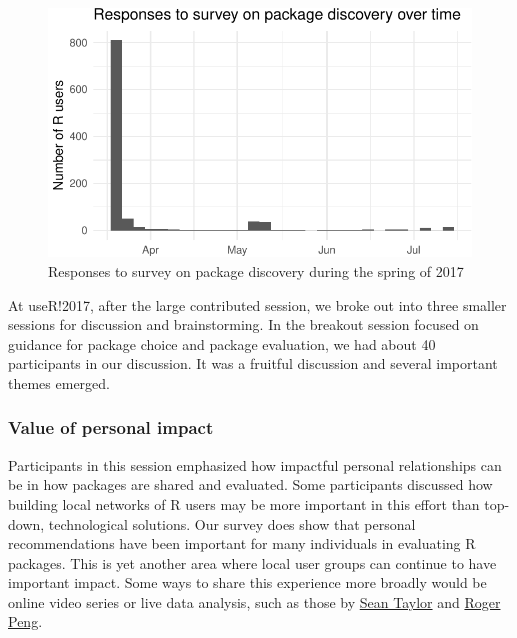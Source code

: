 \begin{Schunk}
\begin{figure}
\includegraphics{navigating_files/figure-latex/survey_time-1} \caption[Responses to survey on package discovery during the spring of 2017]{Responses to survey on package discovery during the spring of 2017}\label{fig:survey_time}
\end{figure}
\end{Schunk}

At useR!2017, after the large contributed session, we broke out into
three smaller sessions for discussion and brainstorming. In the breakout
session focused on guidance for package choice and package evaluation,
we had about 40 participants in our discussion. It was a fruitful
discussion and several important themes emerged.

\hypertarget{value-of-personal-impact}{%
\subsubsection{Value of personal
impact}\label{value-of-personal-impact}}

Participants in this session emphasized how impactful personal
relationships can be in how packages are shared and evaluated. Some
participants discussed how building local networks of R users may be
more important in this effort than top-down, technological solutions.
Our survey does show that personal recommendations have been important
for many individuals in evaluating R packages. This is yet another area
where local user groups can continue to have important impact. Some ways
to share this experience more broadly would be online video series or
live data analysis, such as those by
\href{https://www.facebook.com/seanjtaylor/videos/10103088186201897/?pnref=story}{Sean
Taylor} and
\href{https://twitter.com/rdpeng/status/872090694390861824}{Roger Peng}.

